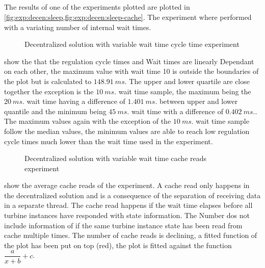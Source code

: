 \subsection{}

The results of one of the  experiments plotted are plotted in \cref{fig:exp:decen:sleep,fig:exp:decen:sleep-cache}.
The experiment where performed with a variating number of internal wait times.

\begin{figure}[h]
	\centering
	
	\caption{Decentralized solution with variable wait time cycle time experiment}
	\label{fig:exp:decen:sleep}
\end{figure}

 show the that the regulation cycle times and Wait times are linearly Dependant on each other, the maximum value with wait time 10 is outside the boundaries of the plot but is calculated to $148.91~ms.$ The upper and lower quartile are close together the exception is the $10~ms.$ wait time sample, the maximum being the $20~ms.$ wait time having a difference of $1.401~ms.$ between upper and lower quantile and the minimum being $45~ms.$ wait time with a difference of $0.402~ms.$. The maximum values again with the exception of the $10~ms.$ wait time sample follow the median values, the minimum values are able to reach low regulation cycle times much lower than the wait time used in the experiment.

\begin{figure}[h]
	\centering
	
	\caption{Decentralized solution with variable wait time cache reads experiment}
	\label{fig:exp:decen:sleep-cache}
\end{figure}

 show the average cache reads of the experiment.
A cache read only happens in the decentralized solution and is a consequence of the separation of receiving data in a separate thread.
The cache read happens if the wait time elapses before all turbine instances have responded with state information. The Number dos not include information of if the same turbine instance state has been read from cache multiple times.
The number of cache reads is declining, a fitted function of the plot has been put on top (red), the plot is fitted against the function $\dfrac{a}{x+b} + c$.

